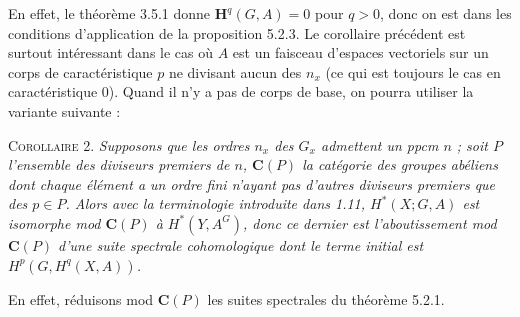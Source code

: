 En effet, le théorème 3.5.1 donne $\mathbf H^q(G,A)=0$ pour $q>0$, donc on est
dans les conditions d'application de la proposition 5.2.3. Le corollaire
précédent est surtout intéressant dans le cas où $A$ est un faisceau d'espaces
vectoriels sur un corps de caractéristique $p$ ne divisant aucun des $n_x$
(ce qui est toujours le cas en caractéristique 0). Quand il n'y a pas de corps
de base, on pourra utiliser la variante suivante :

\textsc{Corollaire 2.} \textit{Supposons que les ordres $n_x$ des
$G_x$ admettent un ppcm $n$ ; soit $P$ l'ensemble des diviseurs premiers de
$n$, ${\mathbf C}(P)$ la catégorie des groupes abéliens dont chaque élément a un ordre
fini n'ayant pas d'autres diviseurs premiers que des $p\in P$. Alors avec la
terminologie introduite dans \textup{1.11}, $H^*(X;G,A)$ est isomorphe mod ${\mathbf C}(P)$ à
$H^*(Y,A^G)$, donc ce dernier est l'aboutissement mod ${\mathbf C}(P)$ d'une suite
spectrale cohomologique dont le terme initial est $H^p(G,H^q(X,A))$.}

En effet, réduisons mod ${\mathbf C}(P)$ les suites spectrales du théorème 5.2.1.

